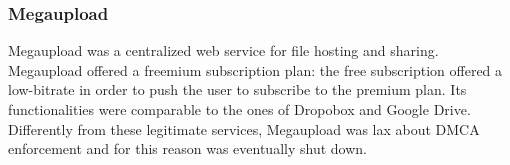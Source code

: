 \subsubsection*{Megaupload}

Megaupload was a centralized web service for file hosting and sharing. Megaupload offered a freemium subscription plan: the free subscription offered a low-bitrate in order to push the user to subscribe to the premium plan. Its functionalities were comparable to the ones of Dropobox and Google Drive. Differently from these legitimate services, Megaupload was lax about DMCA enforcement and for this reason was eventually shut down.